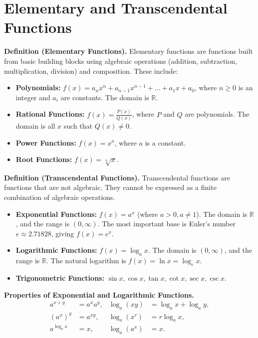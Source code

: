 \documentclass[11pt,a4paper]{article}
\begin{document}
\section{Elementary and Transcendental Functions}
\textbf{Definition (Elementary Functions).} Elementary functions are functions built from basic building blocks using algebraic operations (addition, subtraction, multiplication, division) and composition. These include:
\begin{itemize}
\item \textbf{Polynomials:} $f(x) = a_n x^n + a_{n-1} x^{n-1} + \dots + a_1 x + a_0$, where $n \geq 0$ is an integer and $a_i$ are constants. The domain is $\mathbb{R}$.
\item \textbf{Rational Functions:} $f(x) = \frac{P(x)}{Q(x)}$, where $P$ and $Q$ are polynomials. The domain is all $x$ such that $Q(x) \neq 0$.
\item \textbf{Power Functions:} $f(x) = x^a$, where $a$ is a constant.
\item \textbf{Root Functions:} $f(x) = \sqrt[n]{x}$.
\end{itemize}
\textbf{Definition (Transcendental Functions).} Transcendental functions are functions that are not algebraic. They cannot be expressed as a finite combination of algebraic operations.
\begin{itemize}
\item \textbf{Exponential Functions:} $f(x) = a^x$ (where $a > 0, a \neq 1$). The domain is $\mathbb{R}$, and the range is $(0, \infty)$. The most important base is Euler's number $e \approx 2.71828$, giving $f(x) = e^x$.
\item \textbf{Logarithmic Functions:} $f(x) = \log_a x$. The domain is $(0, \infty)$, and the range is $\mathbb{R}$. The natural logarithm is $f(x) = \ln x = \log_e x$. 
\item \textbf{Trigonometric Functions:} $\sin x, \cos x, \tan x, \cot x, \sec x, \csc x$.
\end{itemize}
\textbf{Properties of Exponential and Logarithmic Functions.}
\begin{align*}
a^{x+y} &= a^x a^y, & \log_a(xy) &= \log_a x + \log_a y, \\
(a^x)^y &= a^{xy}, & \log_a(x^r) &= r \log_a x, \\
a^{\log_a x} &= x, & \log_a(a^x) &= x.
\end{align*}
\end{document}
